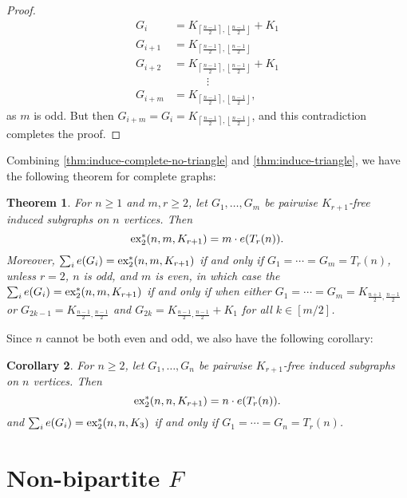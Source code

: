 \documentclass[12pt]{report}
\newtheorem{theorem}{Theorem}[chapter]
\newtheorem{corollary}[theorem]{Corollary}
\newcommand*{\dex}{\textnormal{ex}_2}
\begin{document}
\begin{proof}
  \begin{align*}
    G_i &= K_{\left\lceil\frac{n - 1}{2}\right\rceil, \left\lfloor\frac{n - 1}{2}\right\rfloor} + K_1 \\
    G_{i + 1} &= K_{\left\lceil\frac{n - 1}{2}\right\rceil, \left\lfloor\frac{n - 1}{2}\right\rfloor} \\
    G_{i + 2} &= K_{\left\lceil\frac{n - 1}{2}\right\rceil, \left\lfloor\frac{n - 1}{2}\right\rfloor} + K_1 \\
    &\qquad\quad \vdots \\
    G_{i + m} &= K_{\left\lceil\frac{n - 1}{2}\right\rceil, \left\lfloor\frac{n - 1}{2}\right\rfloor},
  \end{align*}
  as $m$ is odd. But then $G_{i + m} = G_i = K_{\left\lceil\frac{n - 1}{2}\right\rceil, \left\lfloor\frac{n - 1}{2}\right\rfloor}$, and this contradiction completes the proof.
\end{proof}

Combining \cref{thm:induce-complete-no-triangle} and \cref{thm:induce-triangle}, we have the following theorem for complete graphs:

\begin{theorem}\label{thm:induce-complete}
  For $n \geq 1$ and $m, r \geq 2$, let $G_1, \ldots, G_m$ be pairwise $K_{r + 1}$-free induced subgraphs on $n$ vertices. Then
  \[
    \dex^*(n, m, K_{r + 1}) = m \cdot e(T_r(n)).
  \]
  Moreover, $\sum_i e(G_i) = \dex^*(n, m, K_{r + 1})$ if and only if $G_1 = \cdots = G_m = T_r(n)$, unless $r = 2$, $n$ is odd, and $m$ is even, in which case the $\sum_i e(G_i) = \dex^*(n, m, K_{r + 1})$ if and only if when either $G_1 = \cdots = G_m = K_{\frac{n + 1}{2}, \frac{n - 1}{2}}$ or $G_{2k - 1} = K_{\frac{n - 1}{2}, \frac{n - 1}{2}}$ and $G_{2k} = K_{\frac{n - 1}{2}, \frac{n - 1}{2}} + K_1$ for all $k \in [m/2]$.
\end{theorem}

Since $n$ cannot be both even and odd, we also have the following corollary:

\begin{corollary}\label{cor:induce-complete}
  For $n \geq 2$, let $G_1, \ldots, G_n$ be pairwise $K_{r + 1}$-free induced subgraphs on $n$ vertices. Then
  \[
    \dex^*(n, n, K_{r + 1}) = n \cdot e(T_r(n)).
  \]
  and $\sum_i e(G_i) = \dex^*(n, n, K_3)$ if and only if $G_1 = \cdots = G_n = T_r(n)$.
\end{corollary}

\section{Non-bipartite $F$}
\end{document}
